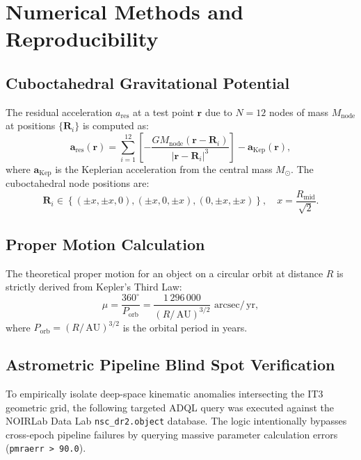 \documentclass[11pt,a4paper]{article}
\theoremstyle{remark}
\newcommand{\AU}{\,\mathrm{AU}}
\newcommand{\yr}{\,\mathrm{yr}}
\newcommand{\arcsec}{\,\mathrm{arcsec}}
\begin{document}
\appendix
\section{Numerical Methods and Reproducibility}

\subsection{Cuboctahedral Gravitational Potential}

The residual acceleration $a_{\text{res}}$ at a test point $\mathbf{r}$ due to $N=12$ nodes of mass $M_{\text{node}}$ at positions $\{\mathbf{R}_i\}$ is computed as:
\begin{equation}
    \mathbf{a}_{\text{res}}(\mathbf{r}) = \sum_{i=1}^{12} \left[ -\frac{GM_{\text{node}}(\mathbf{r} - \mathbf{R}_i)}{|\mathbf{r} - \mathbf{R}_i|^3} \right] - \mathbf{a}_{\text{Kep}}(\mathbf{r}),
\end{equation}
where $\mathbf{a}_{\text{Kep}}$ is the Keplerian acceleration from the central mass $M_\odot$. The cuboctahedral node positions are:
\begin{equation}
    \mathbf{R}_i \in \left\{ (\pm x, \pm x, 0), (\pm x, 0, \pm x), (0, \pm x, \pm x) \right\}, \quad x = \frac{R_{\text{mid}}}{\sqrt{2}}.
\end{equation}

\subsection{Proper Motion Calculation}

The theoretical proper motion for an object on a circular orbit at distance $R$ is strictly derived from Kepler's Third Law:
\begin{equation}
    \mu = \frac{360^\circ}{P_{\text{orb}}} = \frac{1\,296\,000}{(R/\AU)^{3/2}} \,\arcsec/\yr,
\end{equation}
where $P_{\text{orb}} = (R/\AU)^{3/2}$ is the orbital period in years.

\subsection{Astrometric Pipeline Blind Spot Verification}

To empirically isolate deep-space kinematic anomalies intersecting the IT3 geometric grid, the following targeted ADQL query was executed against the NOIRLab Data Lab \texttt{nsc\_dr2.object} database. The logic intentionally bypasses cross-epoch pipeline failures by querying massive parameter calculation errors (\texttt{pmraerr > 90.0}).
\end{document}
